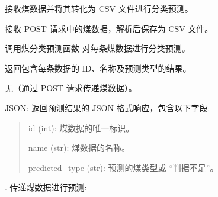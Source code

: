 \documentclass[a4paper,12pt,english]{sphinxmanual}
\begin{document}
\begin{fulllineitems}
\label{\detokenize{api/login:login.getClassifyResult}}
\pysigstartsignatures
{}
\pysigstopsignatures
\sphinxAtStartPar
接收煤数据并将其转化为 CSV 文件进行分类预测。
\begin{description}
\sphinxAtStartPar
接收 POST 请求中的煤数据，解析后保存为 CSV 文件。

\sphinxAtStartPar
调用煤分类预测函数  对每条煤数据进行分类预测。

\sphinxAtStartPar
返回包含每条数据的 ID、名称及预测类型的结果。

\sphinxAtStartPar
无（通过 POST 请求传递煤数据）。

\sphinxAtStartPar
JSON: 返回预测结果的 JSON 格式响应，包含以下字段:
\begin{quote}

\sphinxAtStartPar
id (int): 煤数据的唯一标识。

\sphinxAtStartPar
name (str): 煤数据的名称。

\sphinxAtStartPar
predicted\_type (str): 预测的煤类型或 “判据不足”。
\end{quote}

. 传递煤数据进行预测:

\begin{sphinxVerbatim}[commandchars=\\\{\}]
 
\PYG{p}{[}
         
         
         
         
         
         
         
\PYG{p}{]}


\end{sphinxVerbatim}
\end{description}
\end{fulllineitems}
\end{document}
